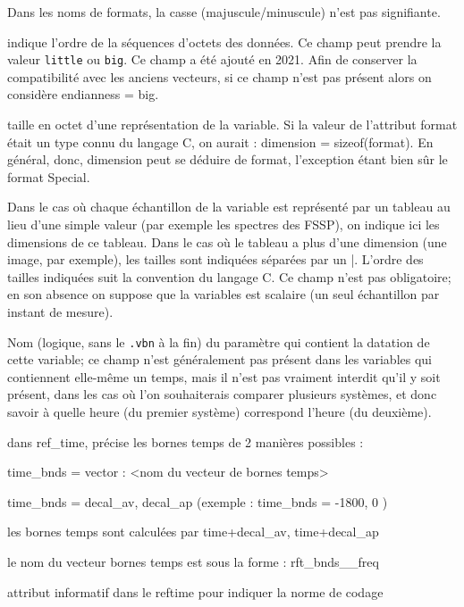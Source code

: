 \begin{description}
  Dans les noms de formats, la casse (majuscule/minuscule) n'est pas signifiante.
  \item[endianness] indique l'ordre de la séquences d'octets des données. Ce champ peut prendre la valeur \texttt{little} ou \texttt{big}. Ce champ a été ajouté en 2021. Afin de conserver la compatibilité avec les anciens vecteurs, si ce champ n'est pas présent alors on considère endianness = big. 
  \item[dimension] taille en octet d'une
représentation de la variable. Si la valeur de l'attribut
\textsf{format} était un type connu du
langage C, on aurait : \textsf {dimension = sizeof(format)}. En
général, donc, \textsf{dimension} peut se
déduire de \textsf{format}, l'exception étant bien sûr le format 
\textsf{Special}.
  \item[dim\_array]  Dans le cas où chaque échantillon de la
variable est représenté par un tableau au lieu d'une simple
valeur (par exemple les spectres des FSSP), on indique ici les dimensions de
ce tableau. Dans le cas où le tableau a plus d'une dimension (une
image, par exemple), les tailles sont indiquées séparées par un \textsf{|}.
L'ordre des tailles indiquées suit la convention
du langage C. Ce champ n'est pas obligatoire; en son absence on suppose
que la variables est scalaire (un seul échantillon par instant de mesure).
   \item[ref\_time] Nom (\og logique\fg{}, sans le \texttt{.vbn} à la fin)
du paramètre qui contient la datation de cette
variable; ce champ n'est généralement pas présent
dans les variables qui contiennent elle-même un temps, mais il n'est pas
vraiment interdit qu'il y soit présent, dans les cas où l'on
souhaiterais comparer plusieurs systèmes, et donc savoir à
quelle heure (du premier système) correspond l'heure (du deuxième).
   \item[time\_bnds] dans ref\_time, précise les bornes temps de 2 manières possibles : 
   
time\_bnds = vector : <nom du vecteur de bornes temps> 

time\_bnds = decal\_av, decal\_ap (exemple : time\_bnds = -1800, 0 ) 

les bornes temps sont calculées par time+decal\_av, time+decal\_ap 

le nom du vecteur bornes temps est sous la forme : rft\_bnds\_<chaine libre>\_freq
    \item[datation\_convention] attribut informatif dans le reftime pour indiquer la norme de codage
     

\end{description}
